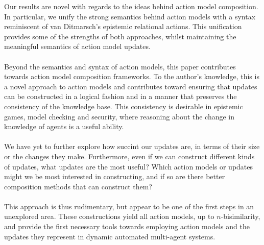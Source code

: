 Our results are novel with regards to the ideas behind action model composition.
In particular, we unify the strong semantics behind action models with a syntax reminiscent of van
Ditmarsch's \cite{ditmarsch2002dga} epistemic relational actions.
This unification provides some of the strengths of both approaches, whilst maintaining the
meaningful semantics of action model updates.\\
\\
Beyond the semantics and syntax of action models, this paper contributes towards action model
composition frameworks.
To the author's knowledge, this is a novel approach to action models and contributes toward ensuring
that updates can be constructed in a logical fashion and in a manner that preserves the consistency
of the knowledge base.
This consistency is desirable in epistemic games, model checking and security, where reasoning about
the change in knowledge of agents is a useful ability.\\
\\
We have yet to further explore how succint our updates are, in terms of their size or the changes
they make.
Furthermore, even if we can construct different kinds of updates, what updates are the most useful?
Which action models or updates might we be most interested in constructing, and if so are there
better composition methods that can construct them?\\
\\
This approach is thus rudimentary, but appear to be one of the first steps in an unexplored area.
These constructions yield all action models, up to $n$-bisimilarity, and provide the first necessary
tools towards employing action models and the updates they represent in dynamic automated
multi-agent systems.
% 
% 
% 
